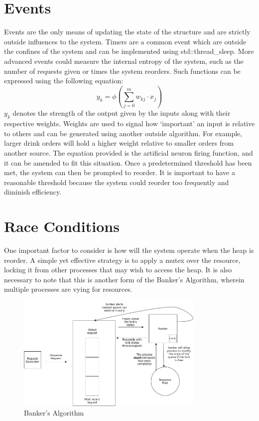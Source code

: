 \documentclass{article}
\begin{document}
\newpage

\section{Events}

Events are the only means of updating the state of the structure and are strictly outside influences to the system.
Timers are a common event which are outside the confines of the system and can be implemented using std::thread_sleep.
More advanced events could measure the internal entropy of the system, such as the number of requests given or times the system reorders.
Such functions can be expressed using the following equation:
\[ 
		y_{k} = \phi \left( \sum_{j=0}^{m}w_{kj} \cdot x_{j} \right)
\]
$y_{k}$ denotes the strength of the output given by the inputs along with their respective weights.
Weights are used to signal how `important' an input is relative to others and can be generated using another outside algorithm.
For example, larger drink orders will hold a higher weight relative to smaller orders from another source.
The equation provided is the artificial neuron firing function, and it can be amended to fit this situation.
Once a predetermined threshold has been met, the system can then be prompted to reorder.
It is important to have a reasonable threshold because the system could reorder too frequently and diminish efficiency.

\section{Race Conditions}

One important factor to consider is how will the system operate when the heap is reorder.
A simple yet effective strategy is to apply a mutex over the resource, locking it from other processes that may wish to access the heap.
It is also necessary to note that this is another form of the Banker's Algorithm, wherein multiple processes are vying for resources.

\begin{figure}[!h]
\centering
\includegraphics[width=9cm]{BankersAlgorithm}
\caption{Banker's Algorithm}
\end{figure}
\end{document}
